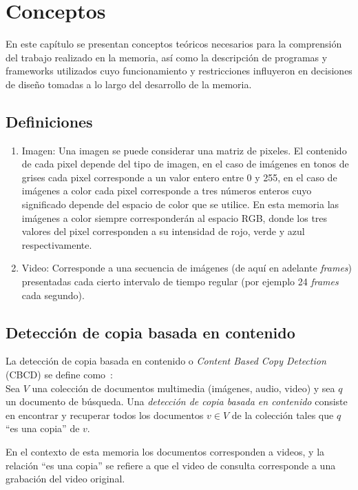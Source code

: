 \chapter{Conceptos}\label{conceptos}

En este capítulo se presentan conceptos teóricos necesarios para la comprensión del trabajo realizado en la memoria, así como la descripción de  programas y frameworks utilizados cuyo funcionamiento y restricciones influyeron en decisiones de diseño tomadas a lo largo del desarrollo de la memoria.

\section{Definiciones}\label{definiciones}
\begin{enumerate}
\item Imagen: Una imagen se puede considerar una matriz de pixeles. El contenido de cada pixel depende del tipo de imagen, en el caso de imágenes en tonos de grises cada pixel corresponde a un valor entero entre 0 y 255, en el caso de imágenes a color cada pixel corresponde a tres números enteros cuyo significado depende del espacio de color que se utilice. En esta memoria las imágenes a color siempre corresponderán al espacio RGB, donde los tres valores del pixel corresponden a su intensidad de rojo, verde y azul respectivamente.

\item Video: Corresponde a una secuencia de imágenes (de aquí en adelante \textit{frames}) presentadas cada cierto intervalo de tiempo regular (por ejemplo 24 \textit{frames} cada segundo). 
\end{enumerate}


\section{Detección de copia basada en contenido}\label{copias}

La detección de copia basada en contenido o \emph{Content Based Copy Detection} (CBCD) se define como~\cite{tesis}: \\
Sea $V$ una colección de documentos multimedia (imágenes, audio, video) y sea $q$ un documento de búsqueda. Una \emph{detección de copia basada en contenido} consiste en encontrar y recuperar todos los documentos $v \in V$ de la colección tales que $q$ ``es una copia'' de $v$.

En el contexto de esta memoria los documentos corresponden a videos, y la relación ``es una copia'' se refiere a que el video de consulta corresponde a una grabación del video original.

